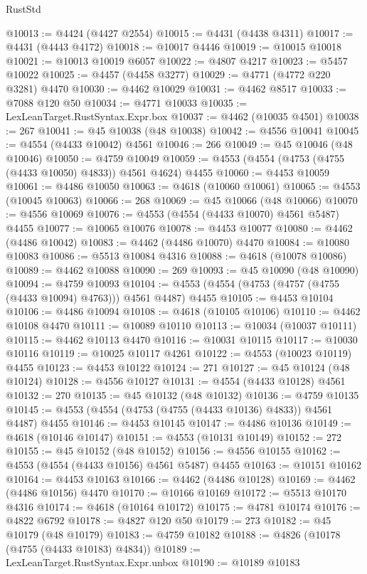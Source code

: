 \begin{lexlean}{RustStd}
\begin{coremodule}
@10013 := @4424 (@4427 @2554)
@10015 := @4431 (@4438 @4311)
@10017 := @4431 (@4443 @4172)
@10018 := @10017 @4446
@10019 := @10015 @10018
@10021 := @10013 @10019 @6057
@10022 := @4807 @4217
@10023 := @5457 @10022
@10025 := @4457 (@4458 @3277)
@10029 := @4771 (@4772 @220 @3281) @4470
@10030 := @4462 @10029
@10031 := @4462 @8517
@10033 := @7088 @120 @50
@10034 := @4771 @10033
@10035 := LexLeanTarget.RustSyntax.Expr.box
@10037 := @4462 (@10035 @4501)
@10038 := 267
@10041 := @45 @10038 (@48 @10038)
@10042 := @4556 @10041
@10045 := @4554 (@4433 @10042) @4561
@10046 := 266
@10049 := @45 @10046 (@48 @10046)
@10050 := @4759 @10049
@10059 := @4553 (@4554 (@4753 (@4755 (@4433 @10050) @4833)) @4561 @4624) @4455
@10060 := @4453 @10059
@10061 := @4486 @10050
@10063 := @4618 (@10060 @10061)
@10065 := @4553 (@10045 @10063)
@10066 := 268
@10069 := @45 @10066 (@48 @10066)
@10070 := @4556 @10069
@10076 := @4553 (@4554 (@4433 @10070) @4561 @5487) @4455
@10077 := @10065 @10076
@10078 := @4453 @10077
@10080 := @4462 (@4486 @10042)
@10083 := @4462 (@4486 @10070) @4470
@10084 := @10080 @10083
@10086 := @5513 @10084 @4316
@10088 := @4618 (@10078 @10086)
@10089 := @4462 @10088
@10090 := 269
@10093 := @45 @10090 (@48 @10090)
@10094 := @4759 @10093
@10104 := @4553 (@4554 (@4753 (@4757 (@4755 (@4433 @10094) @4763))) @4561 @4487) @4455
@10105 := @4453 @10104
@10106 := @4486 @10094
@10108 := @4618 (@10105 @10106)
@10110 := @4462 @10108 @4470
@10111 := @10089 @10110
@10113 := @10034 (@10037 @10111)
@10115 := @4462 @10113 @4470
@10116 := @10031 @10115
@10117 := @10030 @10116
@10119 := @10025 @10117 @4261
@10122 := @4553 (@10023 @10119) @4455
@10123 := @4453 @10122
@10124 := 271
@10127 := @45 @10124 (@48 @10124)
@10128 := @4556 @10127
@10131 := @4554 (@4433 @10128) @4561
@10132 := 270
@10135 := @45 @10132 (@48 @10132)
@10136 := @4759 @10135
@10145 := @4553 (@4554 (@4753 (@4755 (@4433 @10136) @4833)) @4561 @4487) @4455
@10146 := @4453 @10145
@10147 := @4486 @10136
@10149 := @4618 (@10146 @10147)
@10151 := @4553 (@10131 @10149)
@10152 := 272
@10155 := @45 @10152 (@48 @10152)
@10156 := @4556 @10155
@10162 := @4553 (@4554 (@4433 @10156) @4561 @5487) @4455
@10163 := @10151 @10162
@10164 := @4453 @10163
@10166 := @4462 (@4486 @10128)
@10169 := @4462 (@4486 @10156) @4470
@10170 := @10166 @10169
@10172 := @5513 @10170 @4316
@10174 := @4618 (@10164 @10172)
@10175 := @4781 @10174
@10176 := @4822 @6792
@10178 := @4827 @120 @50
@10179 := 273
@10182 := @45 @10179 (@48 @10179)
@10183 := @4759 @10182
@10188 := @4826 (@10178 (@4755 (@4433 @10183) @4834))
@10189 := LexLeanTarget.RustSyntax.Expr.unbox
@10190 := @10189 @10183

\end{coremodule}
\end{lexlean}
